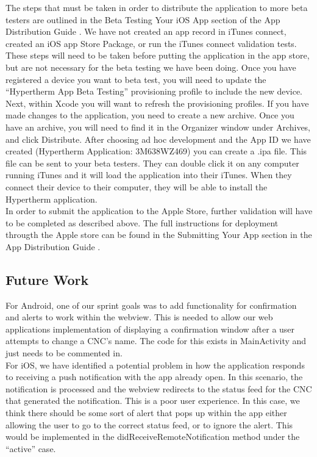\documentclass[12pt,letterpaper,titlepage]{article}
\begin{document}
The steps that must be taken in order to distribute the application to more beta testers are outlined in the Beta Testing Your iOS App section of the App Distribution Guide \cite{apple distribution guide}. We have not created an app record in iTunes connect, created an iOS app Store Package, or run the iTunes connect validation tests. These steps will need to be taken before putting the application in the app store, but are not necessary for the beta testing we have been doing. Once you have registered a device you want to beta test, you will need to update the ``Hypertherm App Beta Testing'' provisioning profile to include the new device. Next, within Xcode you will want to refresh the provisioning profiles. If you have made changes to the application, you need to create a new archive. Once you have an archive, you will need to find it in the Organizer window under Archives, and click Distribute. After choosing ad hoc development and the App ID we have created (Hypertherm Application: 3M638WZ469) you can create a .ipa file. This file can be sent to your beta testers. They can double click it on any computer running iTunes and it will load the application into their iTunes. When they connect their device to their computer, they will be able to install the Hypertherm application.\\

In order to submit the application to the Apple Store, further validation will have to be completed as described above. The full instructions for deployment througth the Apple store can be found in the Submitting Your App section in the App Distribution Guide \cite{apple distribution guide}.

\subsection{Future Work} \label{doc:FutureWork}

For Android, one of our sprint goals was to add functionality for confirmation and alerts to work within the webview. This is needed to allow our web applications implementation of displaying a confirmation window after a user attempts to change a CNC's name. The code for this exists in MainActivity and just needs to be commented in.\\

For iOS, we have identified a potential problem in how the application responds to receiving a push notification with the app already open. In this scenario, the notification is processed and the webview redirects to the status feed for the CNC that generated the notification. This is a poor user experience. In this case, we think there should be some sort of alert that pops up within the app either allowing the user to go to the correct status feed, or to ignore the alert. This would be implemented in the didReceiveRemoteNotification method under the ``active'' case.
\end{document}
